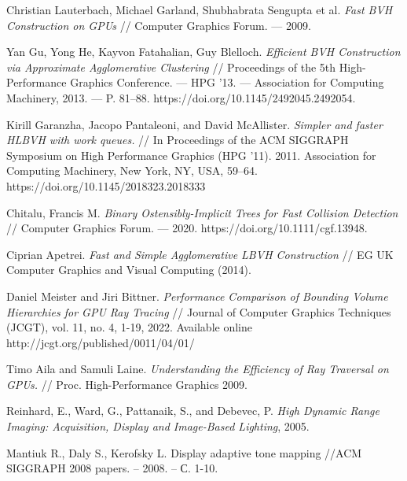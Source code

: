 \documentclass[11pt,fleqn,english,russian]{report} %
\begin{document}
\begin{thebibliography}{10}
	 Christian Lauterbach, Michael Garland, Shubhabrata Sengupta et al. \textit{Fast BVH Construction on GPUs} // Computer Graphics Forum. — 2009.
	
	 Yan Gu, Yong He, Kayvon Fatahalian, Guy Blelloch. \textit{Efficient BVH Construction via Approximate Agglomerative Clustering} // Proceedings of the 5th High-Performance Graphics Conference. — HPG ’13. — Association for Computing Machinery, 2013. — P. 81–88. https://doi.org/10.1145/2492045.2492054.
	
	 Kirill Garanzha, Jacopo Pantaleoni, and David McAllister. \textit{Simpler and faster HLBVH with work queues.} // In Proceedings of the ACM SIGGRAPH Symposium on High Performance Graphics (HPG '11). 2011. Association for Computing Machinery, New York, NY, USA, 59–64. https://doi.org/10.1145/2018323.2018333
	
	 Chitalu, Francis M. \textit{Binary Ostensibly-Implicit Trees for Fast Collision Detection} // Computer Graphics Forum. — 2020. https://doi.org/10.1111/cgf.13948.
	
	 Ciprian Apetrei. \textit{Fast and Simple Agglomerative LBVH Construction} // EG UK Computer Graphics and Visual Computing (2014).
	
	 Daniel Meister and Jiri Bittner. \textit{Performance Comparison of Bounding Volume Hierarchies for GPU Ray Tracing} // Journal of Computer Graphics Techniques (JCGT), vol. 11, no. 4, 1-19, 2022. Available online http://jcgt.org/published/0011/04/01/
	
	 Timo Aila and Samuli Laine. \textit{Understanding the Efficiency of Ray Traversal on GPUs.} // Proc. High-Performance Graphics 2009.
	
	 Reinhard, E., Ward, G., Pattanaik, S., and Debevec, P. \textit{High Dynamic Range Imaging: Acquisition, Display and Image-Based Lighting}, 2005.
	
	 Mantiuk R., Daly S., Kerofsky L. Display adaptive tone mapping //ACM SIGGRAPH 2008 papers. – 2008. – С. 1-10.
	
\end{thebibliography}
\end{document}
